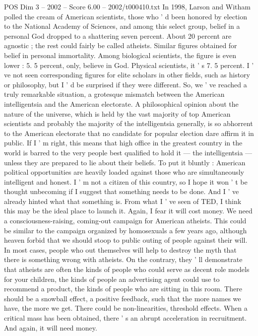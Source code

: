 \begin{textsample}{POS Dim 3 – 2002 – Score 6.00 – 2002/t000410.txt}
In 1998, Larson and Witham polled the cream of American scientists, those who ' d been honored by election to the National Academy of Sciences, and among this select group, belief in a personal God dropped to a shattering seven percent.
About 20 percent are agnostic ; the rest could fairly be called atheists.
Similar figures obtained for belief in personal immortality.
Among biological scientists, the figure is even lower : 5. 5 percent, only, believe in God.
Physical scientists, it ' s 7. 5 percent.
I ' ve not seen corresponding figures for elite scholars in other fields, such as history or philosophy, but I ' d be surprised if they were different.
So, we ' ve reached a truly remarkable situation, a grotesque mismatch between the American intelligentsia and the American electorate.
A philosophical opinion about the nature of the universe, which is held by the vast majority of top American scientists and probably the majority of the intelligentsia generally, is so abhorrent to the American electorate that no candidate for popular election dare affirm it in public.
If I ' m right, this means that high office in the greatest country in the world is barred to the very people best qualified to hold it — the intelligentsia — unless they are prepared to lie about their beliefs.
To put it bluntly : American political opportunities are heavily loaded against those who are simultaneously intelligent and honest.
I ' m not a citizen of this country, so I hope it won ' t be thought unbecoming if I suggest that something needs to be done.
And I ' ve already hinted what that something is.
From what I ' ve seen of TED, I think this may be the ideal place to launch it.
Again, I fear it will cost money.
We need a consciousness-raising, coming-out campaign for American atheists.
This could be similar to the campaign organized by homosexuals a few years ago, although heaven forbid that we should stoop to public outing of people against their will.
In most cases, people who out themselves will help to destroy the myth that there is something wrong with atheists.
On the contrary, they ' ll demonstrate that atheists are often the kinds of people who could serve as decent role models for your children, the kinds of people an advertising agent could use to recommend a product, the kinds of people who are sitting in this room.
There should be a snowball effect, a positive feedback, such that the more names we have, the more we get.
There could be non-linearities, threshold effects.
When a critical mass has been obtained, there ' s an abrupt acceleration in recruitment.
And again, it will need money.

\end{textsample}
